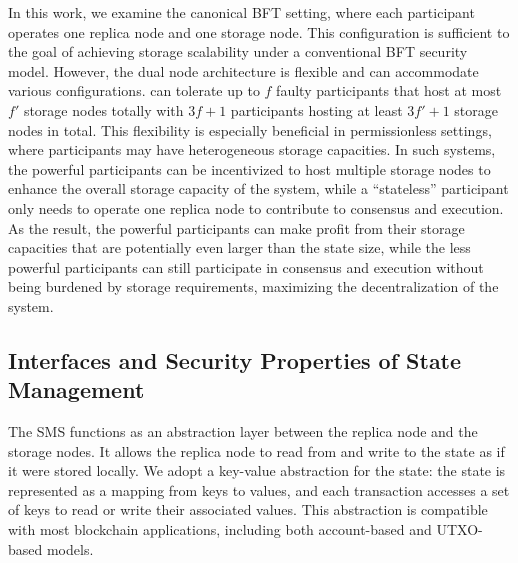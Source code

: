 In this work, we examine the canonical BFT setting, where each participant operates one replica node and one storage node.
This configuration is sufficient to the goal of achieving storage scalability under a conventional BFT security model.
However, the dual node architecture is flexible and can accommodate various configurations.
\sys can tolerate up to $f$ faulty participants that host at most $f'$ storage nodes totally with $3f+1$ participants hosting at least $3f'+1$ storage nodes in total.
This flexibility is especially beneficial in permissionless settings, where participants may have heterogeneous storage capacities.
In such systems, the powerful participants can be incentivized to host multiple storage nodes to enhance the overall storage capacity of the system, while a ``stateless'' participant only needs to operate one replica node to contribute to consensus and execution.
As the result, the powerful participants can make profit from their storage capacities that are potentially even larger than the state size, while the less powerful participants can still participate in consensus and execution without being burdened by storage requirements, maximizing the decentralization of the system.

\subsection{Interfaces and Security Properties of State Management}

The SMS functions as an abstraction layer between the replica node and the storage nodes.
It allows the replica node to read from and write to the state as if it were stored locally.
We adopt a key-value abstraction for the state: the state is represented as a mapping from keys to values, and each transaction accesses a set of keys to read or write their associated values.
This abstraction is compatible with most blockchain applications, including both account-based and UTXO-based models.

